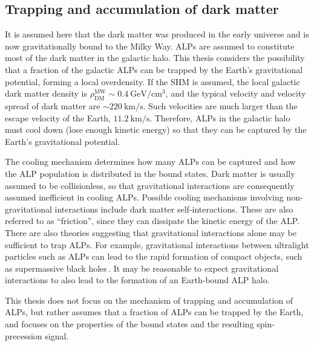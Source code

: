 \subsection{Trapping and accumulation of dark matter}\label{sec:theory:earthALP:trapping}

It is assumed here that the dark matter was produced in the early universe and is now gravitationally bound to the Milky Way.
ALPs are assumed to constitute most of the dark matter in the galactic halo.
This thesis considers the possibility that a fraction of the galactic ALPs can be trapped by the Earth's gravitational potential, forming a local overdensity.
If the SHM is assumed, the local galactic dark matter density is $\rho_\mathrm{DM}^\mathrm{MW}\sim\SI{0.4}{\GeV\per\cm^3}$, and the typical velocity and velocity spread of dark matter are $\sim\SI{220}{\km/\second}$.
Such velocities are much larger than the escape velocity of the Earth, $\SI{11.2}{\km/\second}$.
Therefore, ALPs in the galactic halo must cool down (lose enough kinetic energy) so that they can be captured by the Earth's gravitational potential.

The cooling mechanism determines how many ALPs can be captured and how the ALP population is distributed in the bound states.
Dark matter is usually assumed to be collisionless, so that gravitational interactions are consequently assumed inefficient in cooling ALPs.
Possible cooling mechanisms involving non-gravitational interactions include dark matter self-interactions.
These are also referred to as ``friction'', since they can dissipate the kinetic energy of the ALP.
There are also theories suggesting that gravitational interactions alone may be sufficient to trap ALPs.
For example, gravitational interactions between ultralight particles such as ALPs can lead to the rapid formation of compact objects, such as supermassive black holes\,\cite{Sikivie2026_SMBH}.
It may be reasonable to expect gravitational interactions to also lead to the formation of an Earth-bound ALP halo.

This thesis does not focus on the mechanism of trapping and accumulation of ALPs, but rather assumes that a fraction of ALPs can be trapped by the Earth, and focuses on the properties of the bound states and the resulting spin-precession signal.

